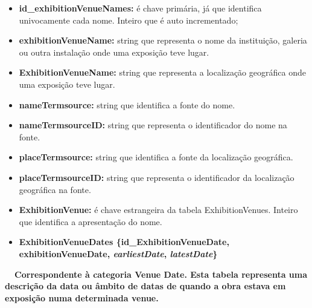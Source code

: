 \documentclass[letterpaper]{article}
\newcommand\textstyleStrongEmphasis[1]{\textbf{#1}}
\newcommand\liststyleLi{%
\renewcommand\labelitemi{{\textbullet}}
\renewcommand\labelitemii{[27A2?]}
\renewcommand\labelitemiii{{\textbullet}}
\renewcommand\labelitemiv{{\textbullet}}
}
\newcommand\liststyleLxiv{%
\renewcommand\labelitemi{[27A2?]}
\renewcommand\labelitemii{[27A2?]}
\renewcommand\labelitemiii{[27A2?]}
\renewcommand\labelitemiv{[27A2?]}
}
\begin{document}
\liststyleLxiv
\begin{itemize}
\item {
\textbf{id\_exhibitionVenueNames: }\'e chave prim\'aria, j\'a que
identifica univocamente cada nome. Inteiro que \'e auto incrementado;}
\item {
\textbf{exhibitionVenueName: }string que representa o nome da
institui\c{c}\~ao, galeria ou outra instala\c{c}\~ao onde uma
exposi\c{c}\~ao teve lugar.}
\item {
\textbf{ExhibitionVenueName:} string que representa a localiza\c{c}\~ao
geogr\'afica onde uma exposi\c{c}\~ao teve lugar.}
\item {
\textbf{nameTermsource: }string que identifica a fonte do nome.}
\item {
\textbf{nameTermsourceID:} string que representa o identificador do nome
na fonte.}
\item {
\textbf{placeTermsource: }string que identifica a fonte da
localiza\c{c}\~ao geogr\'afica.}
\item {
\textbf{placeTermsourceID:} string que representa o identificador da
localiza\c{c}\~ao geogr\'afica na fonte.}
\item {
\textbf{ExhibitionVenue: }\'e chave estrangeira da tabela
ExhibitionVenues. Inteiro que identifica a apresenta\c{c}\~ao do nome.}
\end{itemize}

\bigskip

\liststyleLi
\begin{itemize}
\item {\bfseries
ExhibitionVenueDates\textmd{
\{}\textmd{id\_ExhibitionVenueDate}\textmd{, exhibitionVenueDate,
}\textmd{\textit{earliestDate}}\textmd{,
}\textmd{\textit{latestDate}}\textmd{\}}}
\end{itemize}
{\bfseries
\foreignlanguage{english}{\textmd{\ \ Correspondente \`a categoria
}}\textstyleStrongEmphasis{\foreignlanguage{english}{Venue
Date}}\foreignlanguage{english}{\textmd{. Esta
}}\textstyleStrongEmphasis{\foreignlanguage{english}{\textmd{tabela}}}\foreignlanguage{english}{\textmd{
representa uma descri\c{c}\~ao da data ou \^ambito de datas de quando a
obra estava em exposi\c{c}\~ao numa determinada venue.}}}


\bigskip
\end{document}
